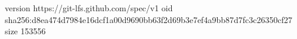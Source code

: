 version https://git-lfs.github.com/spec/v1
oid sha256:d8ea474d7984e16dcf1a00d9690bb63f2d69b3e7ef4a9bb87d7fc3c26350cf27
size 153556
